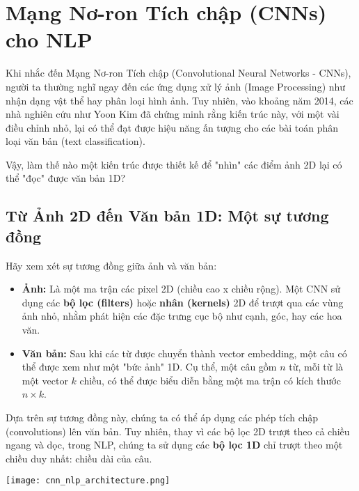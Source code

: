 
\section{Mạng Nơ-ron Tích chập (CNNs) cho NLP}
\label{sec:cnn_for_nlp}

Khi nhắc đến Mạng Nơ-ron Tích chập (Convolutional Neural Networks - CNNs), người ta thường nghĩ ngay đến các ứng dụng xử lý ảnh (Image Processing) như nhận dạng vật thể hay phân loại hình ảnh. Tuy nhiên, vào khoảng năm 2014, các nhà nghiên cứu như Yoon Kim \cite{kim2014convolutional} đã chứng minh rằng kiến trúc này, với một vài điều chỉnh nhỏ, lại có thể đạt được hiệu năng ấn tượng cho các bài toán phân loại văn bản (text classification).

Vậy, làm thế nào một kiến trúc được thiết kế để "nhìn" các điểm ảnh 2D lại có thể "đọc" được văn bản 1D?

\subsection{Từ Ảnh 2D đến Văn bản 1D: Một sự tương đồng}
\label{ssec:cnn_analogy}

Hãy xem xét sự tương đồng giữa ảnh và văn bản:
\begin{itemize}
    \item \textbf{Ảnh:} Là một ma trận các pixel 2D (chiều cao x chiều rộng). Một CNN sử dụng các \textbf{bộ lọc (filters)} hoặc \textbf{nhân (kernels)} 2D để trượt qua các vùng ảnh nhỏ, nhằm phát hiện các đặc trưng cục bộ như cạnh, góc, hay các hoa văn.
    \item \textbf{Văn bản:} Sau khi các từ được chuyển thành vector embedding, một câu có thể được xem như một "bức ảnh" 1D. Cụ thể, một câu gồm $n$ từ, mỗi từ là một vector $k$ chiều, có thể được biểu diễn bằng một ma trận có kích thước $n \times k$.
\end{itemize}

Dựa trên sự tương đồng này, chúng ta có thể áp dụng các phép tích chập (convolutions) lên văn bản. Tuy nhiên, thay vì các bộ lọc 2D trượt theo cả chiều ngang và dọc, trong NLP, chúng ta sử dụng các \textbf{bộ lọc 1D} chỉ trượt theo một chiều duy nhất: chiều dài của câu.

\begin{center}
    \texttt{[image: cnn\_nlp\_architecture.png]}
    \label{fig:cnn_nlp_architecture}
\end{center}

